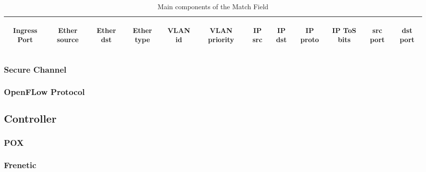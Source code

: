 \begin{table}[h]
\centering
\begin{tabular}{ | c | c | c | c | c | c | c | c | c | c | c | c | }
  \hline                       
  \begin{sideways}Ingress Port\end{sideways} &\begin{sideways}Ether source\end{sideways}  &\begin{sideways}Ether dst\end{sideways}  &\begin{sideways}Ether type\end{sideways}  &\begin{sideways}VLAN id\end{sideways}  &\begin{sideways} VLAN priority\end{sideways} &\begin{sideways}IP src\end{sideways}  &\begin{sideways}IP dst\end{sideways}  &\begin{sideways}IP proto\end{sideways}  &\begin{sideways}IP ToS bits\end{sideways}  &\begin{sideways} src port\end{sideways} &\begin{sideways}dst port\end{sideways}  \\
  \hline  
\end{tabular}
\caption{Main components of the Match Field}
\end{table}

\begin{sideways}\end{sideways}

\subsubsection{Secure Channel}
\label{subsec:SCSecureChannel}

\subsubsection{OpenFLow Protocol}
\label{subsec:OFProtocolSC}


\subsection{Controller}
\label{subsec:OFController}

\subsubsection{POX}
\label{subsec:ContPOX}

\subsubsection{Frenetic}
\label{subsec:ContFren}


